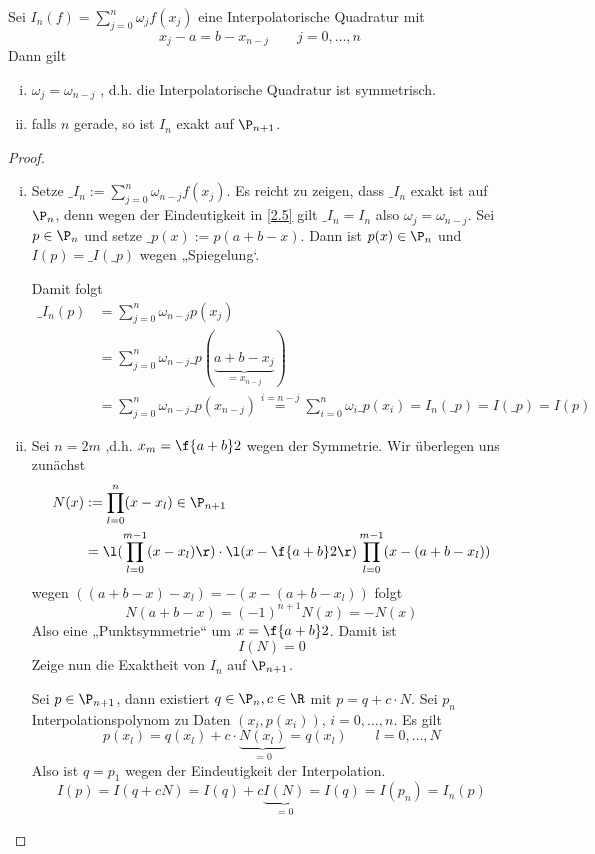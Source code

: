 \documentclass[11pt]{scrartcl}
\begin{document}
\begin{st}
	\label{2.6}
	Sei $I_n(f) = \sum_{j=0}^n \omega_j f(x_j)$ eine Interpolatorische Quadratur mit
	\[
		x_j - a = b - x_{n-j} \qquad j=0,\dotsc,n
	\]
	Dann gilt
	\begin{enumerate}[i)]
		\item
			$\omega_j = \omega_{n-j}$ , d.h. die Interpolatorische Quadratur ist symmetrisch.
		\item
			falls $n$ gerade, so ist $I_n$ exakt auf $\P_{n+1}$.
	\end{enumerate}
	\begin{proof}
		\begin{enumerate}[i)]
			\item
				Setze $\_{I_n} := \sum_{j=0}^n \omega_{n-j}f(x_j)$.
				Es reicht zu zeigen, dass $\_{I_n}$ exakt ist auf $\P_n$, denn wegen der Eindeutigkeit in \ref{2.5} gilt $\_{I_n}=I_n$ also $\omega_j=\omega_{n-j}$.
				Sei $p\in \P_n$ und setze $\_p(x) := p(a+b-x)$.
				Dann ist $p(x) \in \P_n$ und $I(p) = \_I(\_p)$ wegen „Spiegelung‘.

				Damit folgt
				\begin{align*}
					\_I_n (p) &= \sum_{j=0}^n \omega_{n-j}p(x_j) \\
					&=\sum_{j=0}^n \omega_{n-j} \_p(\underbrace{a+b-x_j}_{=x_{n-j}}) \\
					&=\sum_{j=0}^n \omega_{n-j}\_p(x_{n-j})
					\stackrel{i=n-j} = \sum_{i=0}^n \omega_i \_p(x_i)
					= I_n (\_p) = I(\_p) = I(p)
				\end{align*}
			\item
				Sei $n=2m$ ,d.h. $x_m = \f {a+b}2$ wegen der Symmetrie.
				Wir überlegen uns zunächst
				\begin{align*}
					N(x) &:= \prod_{l=0}^n (x-x_l) \in \P_{n+1} \\
					&= \l( \prod_{l=0}^{m-1}(x-x_l)\r) \cdot \l(x-\f {a+b}2\r) \prod_{l=0}^{m-1}(x-(a+b-x_l))
				\end{align*}
				wegen $((a+b-x)-x_l) = -(x-(a+b-x_l))$ folgt
				\[
					N(a+b-x) = (-1)^{n+1}N(x) = - N(x)
				\]
				Also eine „Punktsymmetrie“ um $x = \f {a+b}2$.
				Damit ist
				\[
					I(N) = 0
				\]
				Zeige nun die Exaktheit von $I_n$ auf $\P_{n+1}$.

				Sei $p\in \P_{n+1}$, dann existiert $q\in \P_n, c\in \R$ mit $p=q+c\cdot N$.
				Sei $p_n$ Interpolationspolynom zu Daten $(x_i,p(x_i))$, $i=0,\dotsc,n$.
				Es gilt
				\[
					p(x_l) = q(x_l) + c\cdot \underbrace{N(x_l)}_{=0} = q(x_l) \qquad l=0,\dotsc,N
				\]
				Also ist $q=p_1$ wegen der Eindeutigkeit der Interpolation.
				\[
					I(p) = I(q+cN) = I(q) + c\underbrace{I(N)}_{=0} = I(q) = I(p_n) = I_n(p)
				\]
		\end{enumerate}
	\end{proof}
\end{st}
\end{document}

